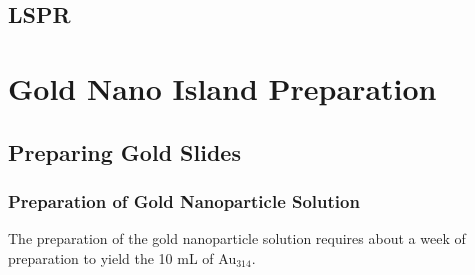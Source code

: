 \documentclass[12pt,oneside,english]{article}
\begin{document}
	\subsection{LSPR}



	\section{Gold Nano Island Preparation}	

	\subsection{Preparing Gold Slides}
	
	\subsubsection{Preparation of Gold Nanoparticle Solution}
	The preparation of the gold nanoparticle solution requires about a week of preparation to yield the 10 mL of Au$_{314}$.
	
\end{document}
